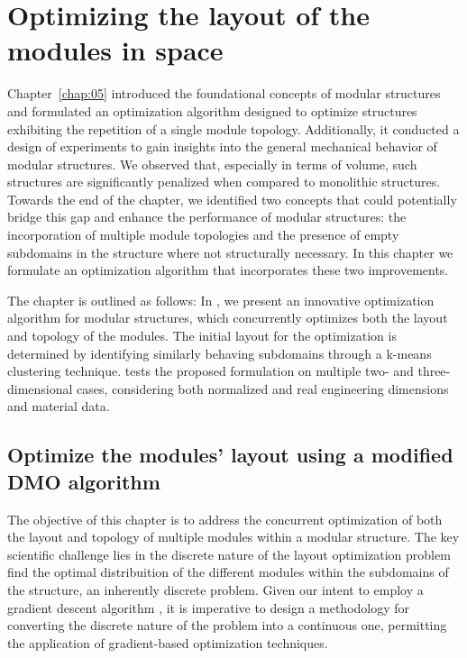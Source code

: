 \setchapterpreamble[u]{\margintoc}
\glsresetall %
\chapter{Optimizing the layout of the modules in space} \label{chap:06}
Chapter~\ref{chap:05} introduced the foundational concepts of modular structures and formulated an optimization algorithm designed to optimize structures exhibiting the repetition of a single module topology. Additionally, it conducted a design of experiments to gain insights into the general mechanical behavior of modular structures. We observed that, especially in terms of volume, such structures are significantly penalized when compared to monolithic structures. Towards the end of the chapter, we identified two concepts that could potentially bridge this gap and enhance the performance of modular structures: the incorporation of multiple module topologies and the presence of empty subdomains in the structure where not structurally necessary. In this chapter we formulate an optimization algorithm that incorporates these two improvements.

The chapter is outlined as follows: In , we present an innovative optimization algorithm for modular structures, which concurrently optimizes both the layout and topology of the modules. The initial layout for the optimization is determined by identifying similarly behaving subdomains through a k-means clustering technique.  tests the proposed formulation on multiple two- and three-dimensional cases, considering both normalized and real engineering dimensions and material data.

\section{Optimize the modules' layout using a modified DMO algorithm} \label{sec:06_opt}
The objective of this chapter is to address the concurrent optimization of both the layout and topology of multiple modules within a modular structure. The key scientific challenge lies in the discrete nature of the layout optimization problem \ie find the optimal distribuition of the different modules within the subdomains of the structure, an inherently discrete problem. Given our intent to employ a gradient descent algorithm , it is imperative to design a methodology for converting the discrete nature of the problem into a continuous one, permitting the application of gradient-based optimization techniques.

